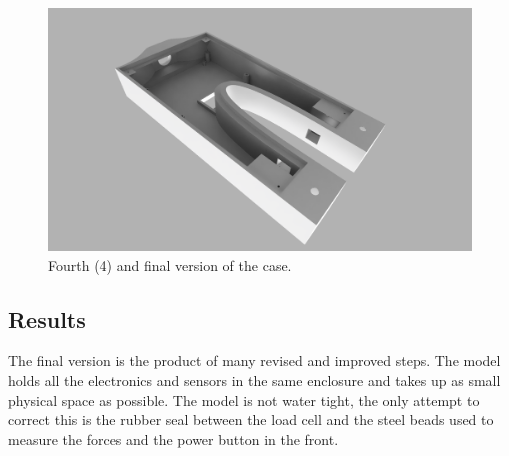 \begin{figure}[H]
\begin{center}
	\includegraphics[width = .8\textwidth]{Figures/Case_rev_4.png}
	\caption{Fourth (4) and final version of the case.}
	\label{Case_rev_4}
\end{center}
\end{figure}

\subsection{Results}
The final version is the product of many revised and improved steps. The model holds all the electronics and sensors in the same enclosure and takes up as small physical space as possible. The model is not water tight, the only attempt to correct this is the rubber seal between the load cell and the steel beads used to measure the forces and the power button in the front.

